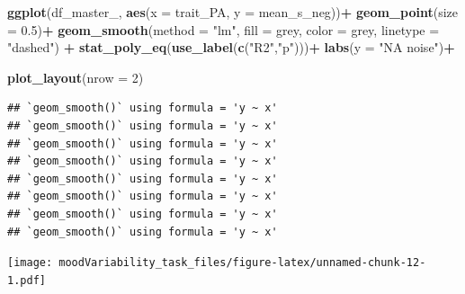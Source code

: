 \documentclass[
]{article}
\newenvironment{Shaded}{\begin{snugshade}}{\end{snugshade}}
\newcommand{\AttributeTok}[1]{\textcolor[rgb]{0.13,0.29,0.53}{#1}}
\newcommand{\DecValTok}[1]{\textcolor[rgb]{0.00,0.00,0.81}{#1}}
\newcommand{\FloatTok}[1]{\textcolor[rgb]{0.00,0.00,0.81}{#1}}
\newcommand{\FunctionTok}[1]{\textcolor[rgb]{0.13,0.29,0.53}{\textbf{#1}}}
\newcommand{\NormalTok}[1]{#1}
\newcommand{\SpecialCharTok}[1]{\textcolor[rgb]{0.81,0.36,0.00}{\textbf{#1}}}
\newcommand{\StringTok}[1]{\textcolor[rgb]{0.31,0.60,0.02}{#1}}
\begin{document}
\begin{Shaded}
\begin{Highlighting}[]
\FunctionTok{ggplot}\NormalTok{(df\_master\_, }\FunctionTok{aes}\NormalTok{(}\AttributeTok{x =}\NormalTok{ trait\_PA, }\AttributeTok{y =}\NormalTok{ mean\_s\_neg))}\SpecialCharTok{+}
  \FunctionTok{geom\_point}\NormalTok{(}\AttributeTok{size =} \FloatTok{0.5}\NormalTok{)}\SpecialCharTok{+}
  \FunctionTok{geom\_smooth}\NormalTok{(}\AttributeTok{method =} \StringTok{"lm"}\NormalTok{, }\AttributeTok{fill =} \StringTok{\textquotesingle{}grey\textquotesingle{}}\NormalTok{, }\AttributeTok{color =} \StringTok{\textquotesingle{}grey\textquotesingle{}}\NormalTok{, }\AttributeTok{linetype =} \StringTok{"dashed"}\NormalTok{) }\SpecialCharTok{+}
  \FunctionTok{stat\_poly\_eq}\NormalTok{(}\FunctionTok{use\_label}\NormalTok{(}\FunctionTok{c}\NormalTok{(}\StringTok{"R2"}\NormalTok{,}\StringTok{"p"}\NormalTok{)))}\SpecialCharTok{+}
  \FunctionTok{labs}\NormalTok{(}\AttributeTok{y =} \StringTok{"NA noise"}\NormalTok{)}\SpecialCharTok{+}

  \FunctionTok{plot\_layout}\NormalTok{(}\AttributeTok{nrow =} \DecValTok{2}\NormalTok{)}
\end{Highlighting}
\end{Shaded}

\begin{verbatim}
## `geom_smooth()` using formula = 'y ~ x'
## `geom_smooth()` using formula = 'y ~ x'
## `geom_smooth()` using formula = 'y ~ x'
## `geom_smooth()` using formula = 'y ~ x'
## `geom_smooth()` using formula = 'y ~ x'
## `geom_smooth()` using formula = 'y ~ x'
## `geom_smooth()` using formula = 'y ~ x'
## `geom_smooth()` using formula = 'y ~ x'
\end{verbatim}

\texttt{[image: moodVariability\_task\_files/figure-latex/unnamed-chunk-12-1.pdf]}
\end{document}
